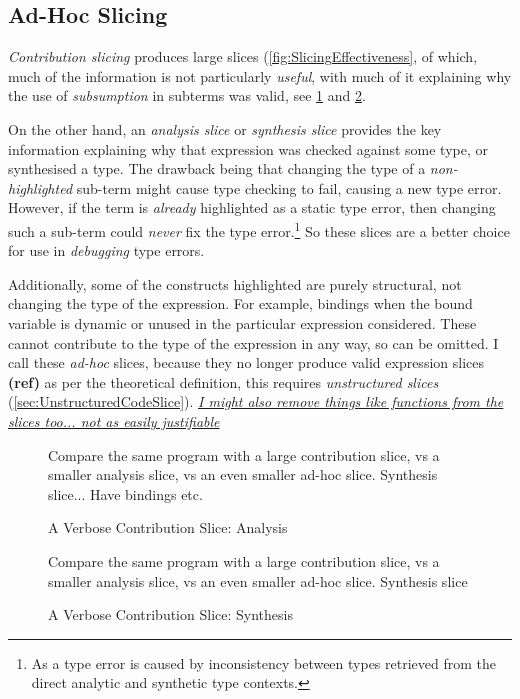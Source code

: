 \subsection{Ad-Hoc Slicing}\label{sec:SlicingAnalysis}
\textit{Contribution slicing} produces large slices (\cref{fig:SlicingEffectiveness}, of which, much of the information is not particularly \textit{useful}, with much of it explaining why the use of \textit{subsumption} in subterms was valid, see \cref{fig:VerboseSlice1} and \ref{fig:VerboseSlice2}. 

On the other hand, an \textit{analysis slice} or \textit{synthesis slice} provides the key information explaining why that expression was checked against some type, or synthesised a type. The drawback being that changing the type of a \textit{non-highlighted} sub-term might cause type checking to fail, causing a new type error. However, if the term is \textit{already} highlighted as a static type error, then changing such a sub-term could \textit{never} fix the type error.\footnote{As a type error is caused by inconsistency between types retrieved from the direct analytic and synthetic type contexts.} So these slices are a better choice for use in \textit{debugging} type errors.

Additionally, some of the constructs highlighted are purely structural, not changing the type of the expression. For example, bindings when the bound variable is dynamic or unused in the particular expression considered. These cannot contribute to the type of the expression in any way, so can be omitted. I call these \textit{ad-hoc} slices, because they no longer produce valid expression slices \textbf{(ref)} as per the theoretical definition, this requires \textit{unstructured slices} (\cref{sec:UnstructuredCodeSlice}). \textit{\underline{I might also remove things like functions from the slices too... not as easily justifiable}}

\begin{figure}[h]
Compare the same program with a large contribution slice, vs a smaller analysis slice, vs an even smaller ad-hoc slice. Synthesis slice... Have bindings etc.
\caption{A Verbose Contribution Slice: Analysis}\label{fig:VerboseSlice1}
\end{figure}
\begin{figure}
Compare the same program with a large contribution slice, vs a smaller analysis slice, vs an even smaller ad-hoc slice. Synthesis slice
\caption{A Verbose Contribution Slice: Synthesis}
\label{fig:VerboseSlice2}
\end{figure}

